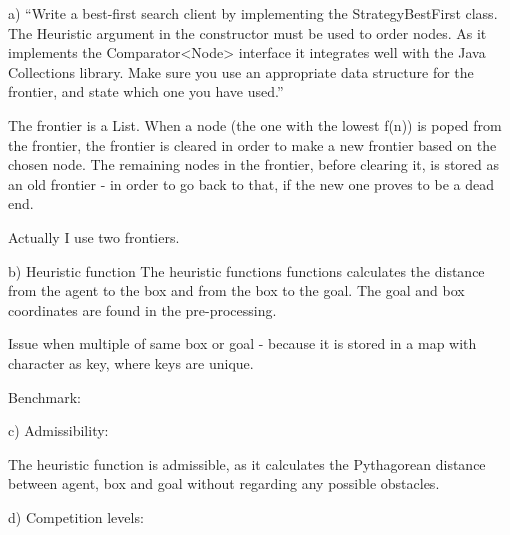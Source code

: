 \documentclass[Main]{subfiles}
\begin{document}
a) ``Write a best-first search client by implementing the StrategyBestFirst class. The Heuristic argument in the constructor must be used to order nodes. As it implements the Comparator<Node> interface it integrates well with the Java Collections library. Make sure you use an appropriate data structure for the frontier, and state which one you have used.''


The frontier is a List. When a node (the one with the lowest f(n)) is poped from the frontier, the frontier is cleared in order to make a new frontier based on the chosen node. The remaining nodes in the frontier, before clearing it, is stored as an old frontier - in order to go back to that, if the new one proves to be a dead end. 

Actually I use two frontiers. 


b)
Heuristic function
The heuristic functions functions calculates the distance from the agent to the box and from the box to the goal. The goal and box coordinates are found in the pre-processing.

Issue when multiple of same box or goal - because it is stored in a map with character as key, where keys are unique. 


Benchmark:





c) 
Admissibility:

The heuristic function is admissible, as it calculates the Pythagorean distance between agent, box and goal without regarding any possible obstacles. 



d) Competition levels:
\end{document}
